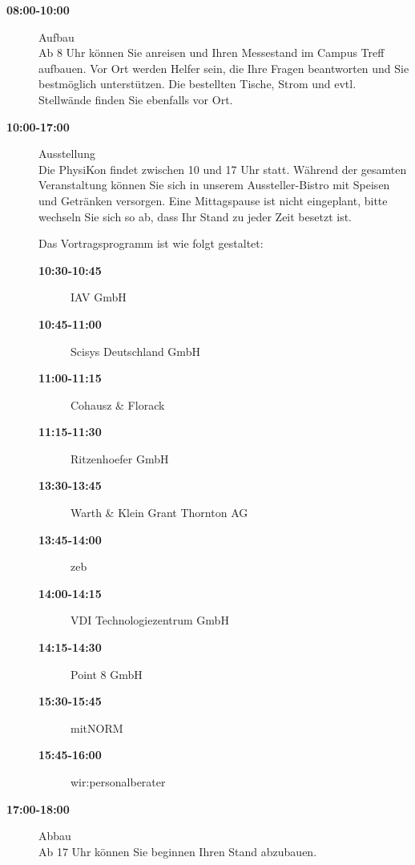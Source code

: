 \documentclass[
  paper=a4,
  fontsize=12pt,
  DIV=16,
  headheight=30pt,
  footheight=45pt,
  headinclude,
  parskip=half,
]{scrartcl}
\begin{document}
\begin{description}
  \item[\textbf{08:00-10:00}] Aufbau\\
    Ab 8 Uhr können Sie anreisen und Ihren Messestand im Campus Treff aufbauen. Vor Ort werden Helfer sein, die Ihre Fragen beantworten und Sie bestmöglich unterstützen. Die bestellten Tische, Strom und evtl. Stellwände finden Sie ebenfalls vor Ort.
  \item[\textbf{10:00-17:00}] Ausstellung\\
    Die PhysiKon findet zwischen 10 und 17 Uhr statt.
    Während der gesamten Veranstaltung können Sie sich in unserem Aussteller-Bistro mit Speisen und Getränken versorgen. Eine Mittagspause ist nicht eingeplant, bitte wechseln Sie sich so ab, dass Ihr Stand zu jeder Zeit besetzt ist.

    Das Vortragsprogramm ist wie folgt gestaltet:
    \begin{description}
      \item[\textbf{10:30-10:45}] IAV GmbH
      \item[\textbf{10:45-11:00}] Scisys Deutschland GmbH
      \item[\textbf{11:00-11:15}] Cohausz \& Florack
      \item[\textbf{11:15-11:30}] Ritzenhoefer GmbH
      \item[ ]
      \item[\textbf{13:30-13:45}] Warth \& Klein Grant Thornton AG
      \item[\textbf{13:45-14:00}] zeb
      \item[\textbf{14:00-14:15}] VDI Technologiezentrum GmbH
      \item[\textbf{14:15-14:30}] Point 8 GmbH
      \item[ ]
      \item[\textbf{15:30-15:45}] mitNORM
      \item[\textbf{15:45-16:00}] wir:personalberater
    \end{description}
  \item[\textbf{17:00-18:00}] Abbau\\
    Ab 17 Uhr können Sie beginnen Ihren Stand abzubauen.
\end{description}
\end{document}
